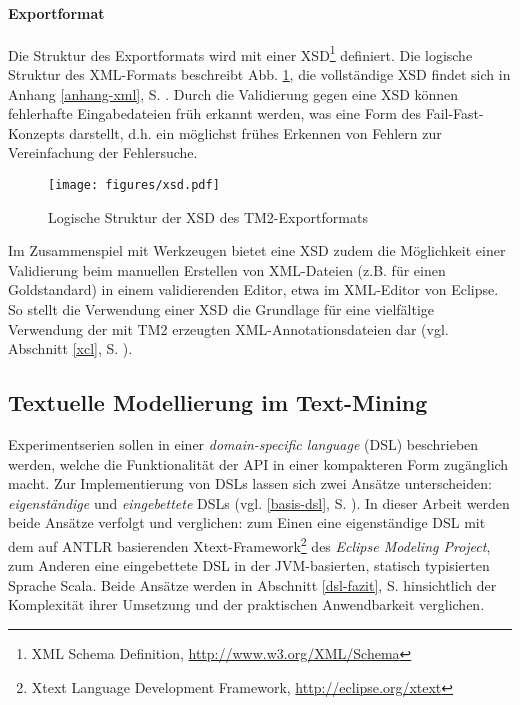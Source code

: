 \documentclass[abstracton, 12pt]{scrartcl}
\begin{document}
\paragraph{Exportformat} \label{impl-xsd}

Die Struktur des Exportformats wird mit einer XSD\footnote{XML Schema Definition, \url{http://www.w3.org/XML/Schema}} definiert. Die logische Struktur des XML-Formats beschreibt Abb. \ref{xsd-struktur}, die vollständige XSD findet sich in Anhang \ref{anhang-xml}, S. \pageref{anhang-xml}. Durch die Validierung gegen eine XSD können fehlerhafte Eingabedateien früh erkannt werden, was eine Form des Fail-Fast-Konzepts \citep{Shore2004} darstellt, d.h. ein möglichst frühes Erkennen von Fehlern zur Vereinfachung der Fehlersuche.

\begin{figure}
\begin{center}
  \texttt{[image: figures/xsd.pdf]}
  \caption{Logische Struktur der XSD des TM2-Exportformats}
  \label{xsd-struktur}
\end{center}
\end{figure}

Im Zusammenspiel mit Werkzeugen bietet eine XSD zudem die Möglichkeit einer Validierung beim manuellen Erstellen von XML-Dateien (z.B. für einen Goldstandard) in einem validierenden Editor, etwa im XML-Editor von Eclipse. So stellt die Verwendung einer XSD die Grundlage für eine vielfältige Verwendung der mit TM2 erzeugten XML-Annotationsdateien dar (vgl. Abschnitt \ref{xcl}, S. \pageref{xcl}).

\subsection{Textuelle Modellierung im Text-Mining} \label{werk-dsl}    

Experimentserien sollen in einer \emph{domain-specific language} (DSL) beschrieben werden, welche die Funktionalität der API in einer kompakteren Form zugänglich macht. Zur Implementierung von DSLs lassen sich zwei Ansätze unterscheiden: \emph{eigenständige} und \emph{eingebettete} DSLs (vgl. \ref{basis-dsl}, S. \pageref{basis-dsl}). In dieser Arbeit werden beide Ansätze verfolgt und verglichen: zum Einen eine eigenständige DSL mit dem auf ANTLR \citep{Parr2007} basierenden Xtext-Framework\footnote{Xtext Language Development Framework, \url{http://eclipse.org/xtext}} des \emph{Eclipse Modeling Project}, zum Anderen eine eingebettete DSL in der JVM-basierten, statisch typisierten Sprache Scala. Beide Ansätze werden in Abschnitt \ref{dsl-fazit}, S. \pageref{dsl-fazit} hinsichtlich der Komplexität ihrer Umsetzung und der praktischen Anwendbarkeit verglichen.
\end{document}
